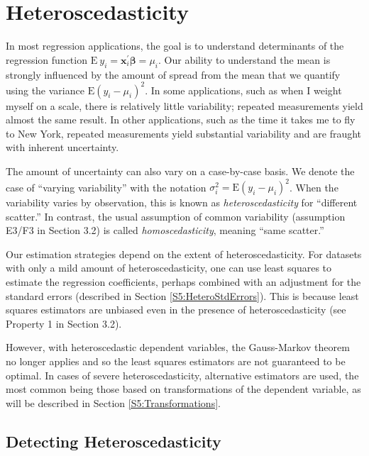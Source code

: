 \section{Heteroscedasticity}\label{S5:Heteroscedasticity}

In most regression applications, the goal is to understand
determinants of the regression function $\mathrm{E~}y_i =
\mathbf{x}_i^{\prime} \boldsymbol \beta =\mu_i$. Our ability to
understand the mean is strongly influenced by the amount of spread
from the mean that we quantify using the variance
$\mathrm{E}\left(y_i-\mu_i\right)^2$. In some applications, such as
when I weight myself on a scale, there is relatively little
variability; repeated measurements yield almost the same result. In
other applications, such as the time it takes me to fly to New York,
repeated measurements yield substantial variability and are fraught
with inherent uncertainty.

The amount of uncertainty can also vary on a case-by-case basis. We
denote the case of ``varying variability'' with the notation
$\sigma_i^2=\mathrm{E}\left(y_i-\mu_i\right)^2$. When the
variability varies by observation, this is known as
\emph{heteroscedasticity} for ``different scatter.''  In contrast,
the usual assumption of common variability (assumption E3/F3 in
Section 3.2) is called \textit{homoscedasticity}, meaning ``same
scatter.''

Our estimation strategies depend on the extent of
heteroscedasticity. For datasets with only a mild amount of
heteroscedasticity, one can use least squares to estimate the
regression coefficients, perhaps combined with an adjustment for the
standard errors (described in Section \ref{S5:HeteroStdErrors}).
This is because least squares estimators are unbiased even in the
presence of heteroscedasticity (see Property 1 in Section 3.2).

However, with heteroscedastic dependent variables, the Gauss-Markov
theorem no longer applies and so the least squares estimators are
not guaranteed to be optimal. In cases of severe heteroscedasticity,
alternative estimators are used, the most common being those based
on transformations of the dependent variable, as will be described
in Section \ref{S5:Transformations}.

\subsection{Detecting Heteroscedasticity}

